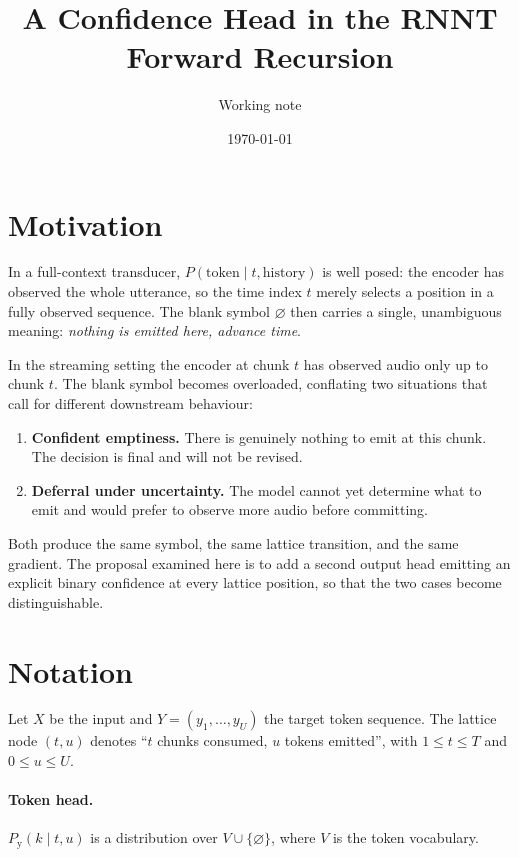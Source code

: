 \documentclass[11pt]{article}
\title{A Confidence Head in the RNNT Forward Recursion}
\author{Working note}
\date{\today}
\newcommand{\blank}{\varnothing}
\newcommand{\Py}{P_{\mathrm{y}}}
\begin{document}
\maketitle

\section{Motivation}

In a full-context transducer, $P(\text{token} \mid t, \text{history})$ is well posed:
the encoder has observed the whole utterance, so the time index $t$ merely selects
a position in a fully observed sequence. The blank symbol $\blank$ then carries a
single, unambiguous meaning: \emph{nothing is emitted here, advance time}.

In the streaming setting the encoder at chunk $t$ has observed audio only up to
chunk $t$. The blank symbol becomes overloaded, conflating two situations that
call for different downstream behaviour:

\begin{enumerate}
  \item \textbf{Confident emptiness.} There is genuinely nothing to emit at this
        chunk. The decision is final and will not be revised.
  \item \textbf{Deferral under uncertainty.} The model cannot yet determine what
        to emit and would prefer to observe more audio before committing.
\end{enumerate}

Both produce the same symbol, the same lattice transition, and the same gradient.
The proposal examined here is to add a second output head emitting an explicit
binary confidence at every lattice position, so that the two cases become
distinguishable.

\section{Notation}

Let $X$ be the input and $Y = (y_1,\dots,y_U)$ the target token sequence. The
lattice node $(t,u)$ denotes ``$t$ chunks consumed, $u$ tokens emitted'', with
$1 \le t \le T$ and $0 \le u \le U$.

\paragraph{Token head.} $\Py(k \mid t,u)$ is a distribution over
$V \cup \{\blank\}$, where $V$ is the token vocabulary.
\end{document}
